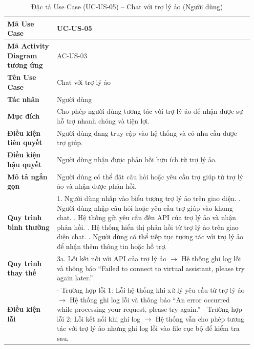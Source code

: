 \renewcommand{\arraystretch}{1.3}
\setlength{\tabcolsep}{4pt}
\begin{longtable}{|p{}|p{}|}
\caption{Đặc tả Use Case (UC-US-05) -- Chat với trợ lý ảo (Người dùng) }\label{tab:uc_chat_virtual_assistant_user}\\
\hline
\textbf{Mã Use Case} & UC-US-05 \\ \hline
\textbf{Mã Activity Diagram tương ứng} & AC-US-03 \\ \hline
\textbf{Tên Use Case} & Chat với trợ lý ảo \\ \hline
\textbf{Tác nhân} & Người dùng \\ \hline
\textbf{Mục đích} & Cho phép người dùng tương tác với trợ lý ảo để nhận được sự hỗ trợ nhanh chóng và tiện lợi. \\ \hline
\textbf{Điều kiện tiên quyết} & Người dùng đang truy cập vào hệ thống và có nhu cầu được trợ giúp. \\ \hline
\textbf{Điều kiện hậu quyết} & Người dùng nhận được phản hồi hữu ích từ trợ lý ảo. \\ \hline
\textbf{Mô tả ngắn gọn} & Người dùng có thể đặt câu hỏi hoặc yêu cầu trợ giúp từ trợ lý ảo và nhận được phản hồi. \\ \hline
\textbf{Quy trình bình thường} &
1. Người dùng nhấp vào biểu tượng trợ lý ảo trên giao diện. \newline
2. Người dùng nhập câu hỏi hoặc yêu cầu trợ giúp vào khung chat. \newline
3. Hệ thống gửi yêu cầu đến API của trợ lý ảo và nhận phản hồi. \newline
4. Hệ thống hiển thị phản hồi từ trợ lý ảo trên giao diện chat. \newline
5. Người dùng có thể tiếp tục tương tác với trợ lý ảo để nhận thêm thông tin hoặc hỗ trợ. \\ \hline
\textbf{Quy trình thay thế} &
3a. Lỗi kết nối với API của trợ lý ảo $\rightarrow$ Hệ thống ghi log lỗi và thông báo “Failed to connect to virtual assistant, please try again later.” \\ \hline
\textbf{Điều kiện lỗi} &
- Trường hợp lỗi 1: Lỗi hệ thống khi xử lý yêu cầu từ trợ lý ảo $\rightarrow$ Hệ thống ghi log lỗi và thông báo “An error occurred while processing your request, please try again.” \newline
- Trường hợp lỗi 2: Lỗi kết nối khi ghi log $\rightarrow$ Hệ thống vẫn cho phép tương tác với trợ lý ảo nhưng ghi log lỗi vào file cục bộ để kiểm tra sau. \\ \hline
\end{longtable}



